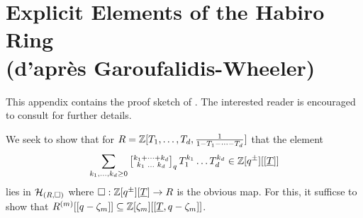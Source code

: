 \section{Explicit Elements of the Habiro Ring \\ (d'apr\`{e}s Garoufalidis-Wheeler)}\label{appdx: explicit elements}
This appendix contains the proof sketch of . The interested reader is encouraged to consult \cite{GWClassesHabiroCoh} for further details. 

We seek to show that for $R=\mathbb{Z}[T_{1},\dots,T_{d},\frac{1}{1-T_{1}-\dots-T_{d}}]$ that the element 
\begin{equation}\label{eqn: Habiro element}
    \sum_{k_{1},\dots,k_{d}\geq0}\left[\substack{k_{1}+\dots+k_{d} \\ k_{1}\text{ }\dots\text{ }k_{d}}\right]_{q}T_{1}^{k_{1}}\dots T_{d}^{k_{d}}\in\mathbb{Z}[q^{\pm}][[\underline{T}]]
\end{equation}
lies in $\mathcal{H}_{(R,\square)}$ where $\square:\mathbb{Z}[q^{\pm}][\underline{T}]\to R$ is the obvious map. For this, it sufficse to show that $R^{(m)}[[q-\zeta_{m}]]\subseteq\mathbb{Z}[\zeta_{m}][[\underline{T},q-\zeta_{m}]]$. 


